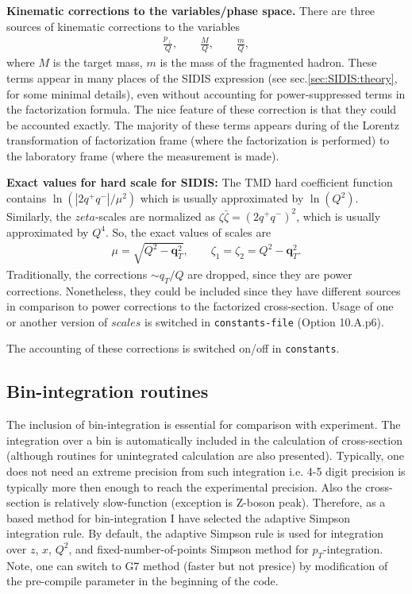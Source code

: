 \documentclass[prd,nofootinbib,eqsecnum,final]{revtex4}
\newcommand{\nn}{\nonumber}
\renewcommand{\(}{\left(}
\renewcommand{\)}{\right)}
\renewcommand{\[}{\left[}
\renewcommand{\]}{\right]}
\renewcommand{\vec}[1]{\bm{#1}}
\begin{document}
\textbf{Kinematic corrections to the variables/phase space.} There are three sources of kinematic corrections to the variables
\begin{eqnarray}\nn
\frac{p_\perp}{Q},\qquad \frac{M}{Q},\qquad \frac{m}{Q},
\end{eqnarray}
where $M$ is the target mass, $m$ is the mass of the fragmented hadron. These terms appear in many places of the SIDIS expression (see sec.\ref{sec:SIDIS:theory}, for some minimal details), even without accounting for power-suppressed terms in the factorization formula. The nice feature of these correction is that they could be accounted exactly. The majority of these terms appears during of the Lorentz transformation of factorization frame (where the factorization is performed) to the laboratory frame (where the measurement is made).

\textbf{Exact values for hard scale for SIDIS:} The TMD hard coefficient function contains $\ln(|2q^+q^-|/\mu^2)$ which is usually approximated by $\ln(Q^2)$. Similarly, the $zeta$-scales are normalized as $\zeta \bar \zeta=(2q^+q^-)^2$, which is usually approximated by $Q^4$. So, the exact values of scales are
\begin{eqnarray}
\mu=\sqrt{Q^2-\vec q_T^2},\qquad \zeta_1=\zeta_2=Q^2-\vec q_T^2.
\end{eqnarray}
Traditionally, the corrections $\sim q_T/Q$ are dropped, since they are power corrections. Nonetheless, they could be included since they have different sources in comparison to power corrections to the factorized cross-section. Usage of one or another version of $scales$ is switched in \texttt{constants-file} (Option 10.A.p6).

The accounting of these corrections is switched on/off in \texttt{constants}. 

\subsection{Bin-integration routines}

The inclusion of bin-integration is essential for comparison with experiment. The integration over a bin is automatically included in the calculation of cross-section (although routines for unintegrated calculation are also presented). Typically, one does not need an extreme precision from such integration i.e. 4-5 digit precision is typically more then enough to reach the experimental precision. Also the cross-section is relatively slow-function (exception is Z-boson peak). Therefore, as a based method for bin-integration I have selected the adaptive Simpson integration rule. By default, the adaptive Simpson rule is used for integration over $z$, $x$, $Q^2$, and fixed-number-of-points Simpson method for $p_T$-integration. Note, one can switch to G7 method (faster but not presice) by modification of the pre-compile parameter in the beginning of the code.
\end{document}
